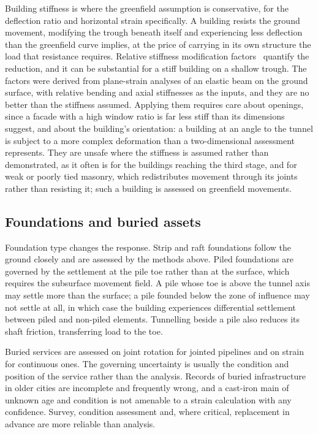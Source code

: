 Building stiffness is where the greenfield assumption is conservative, for the
deflection ratio and horizontal strain specifically. A
building resists the ground movement, modifying the trough
beneath itself and experiencing less deflection than the greenfield curve
implies, at the price of carrying in its own structure the load that resistance
requires. Relative stiffness modification factors~\citep{potts1997structures}
quantify the reduction, and it
can be substantial for a stiff building on a shallow trough. The factors were
derived from plane-strain analyses of an elastic beam on the ground surface,
with relative bending and axial stiffnesses as the inputs, and they are no
better than the stiffness assumed. Applying them requires care about openings, since a facade with a high window
ratio is far less stiff than its dimensions suggest, and about the building's
orientation: a building at an angle to the tunnel is subject to a more
complex deformation than a two-dimensional assessment represents. They are
unsafe where the stiffness is assumed rather than demonstrated, as it often is
for the buildings reaching the third stage, and for weak or poorly
tied masonry, which redistributes movement through its joints rather than
resisting it; such a building is assessed on greenfield movements.

\subsection{Foundations and buried assets}
\label{sec:foundations-buried}

Foundation type changes the response. Strip and raft foundations follow the
ground closely and are assessed by the methods above. Piled foundations are
governed by the settlement at the pile toe rather than at the surface, which
requires the subsurface movement field. A pile whose toe is above the tunnel
axis may settle more than the surface; a pile founded below the zone of
influence may not settle at all, in which case the building experiences
differential settlement between piled and non-piled elements. Tunnelling
beside a pile also reduces its shaft friction, transferring load to the toe.

Buried services are assessed on joint rotation for jointed pipelines and on
strain for continuous ones. The governing uncertainty is usually the condition
and position of the service rather than the analysis. Records of buried
infrastructure in older cities are incomplete and frequently wrong, and a
cast-iron main of unknown age and condition is not amenable to a strain
calculation with any confidence. Survey, condition assessment and, where
critical, replacement in advance are more reliable than analysis.

